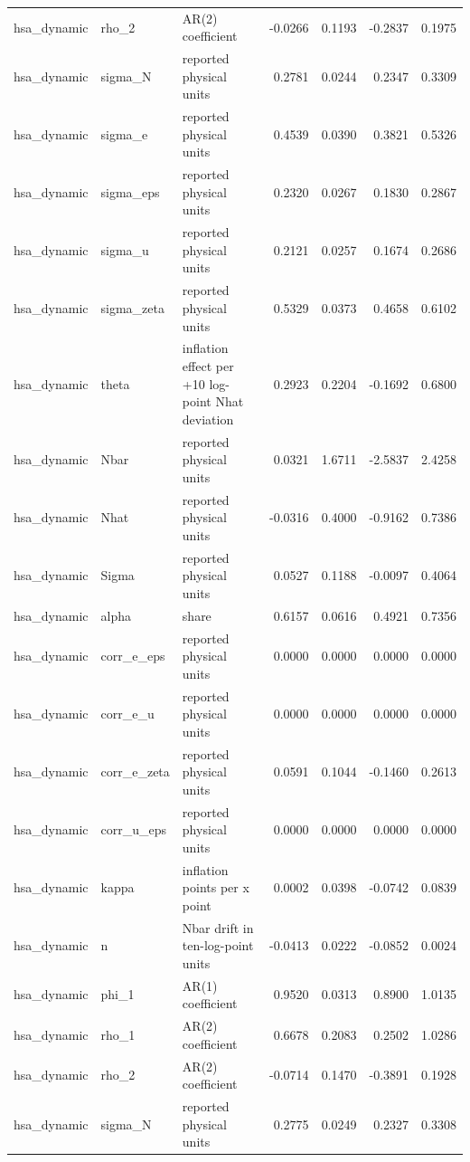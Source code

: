 \begin{tabular}{lllrrrr}
hsa\_dynamic & rho\_2 & AR(2) coefficient & -0.0266 & 0.1193 & -0.2837 & 0.1975 \\
hsa\_dynamic & sigma\_N & reported physical units & 0.2781 & 0.0244 & 0.2347 & 0.3309 \\
hsa\_dynamic & sigma\_e & reported physical units & 0.4539 & 0.0390 & 0.3821 & 0.5326 \\
hsa\_dynamic & sigma\_eps & reported physical units & 0.2320 & 0.0267 & 0.1830 & 0.2867 \\
hsa\_dynamic & sigma\_u & reported physical units & 0.2121 & 0.0257 & 0.1674 & 0.2686 \\
hsa\_dynamic & sigma\_zeta & reported physical units & 0.5329 & 0.0373 & 0.4658 & 0.6102 \\
hsa\_dynamic & theta & inflation effect per +10 log-point Nhat deviation & 0.2923 & 0.2204 & -0.1692 & 0.6800 \\
hsa\_dynamic & Nbar & reported physical units & 0.0321 & 1.6711 & -2.5837 & 2.4258 \\
hsa\_dynamic & Nhat & reported physical units & -0.0316 & 0.4000 & -0.9162 & 0.7386 \\
hsa\_dynamic & Sigma & reported physical units & 0.0527 & 0.1188 & -0.0097 & 0.4064 \\
hsa\_dynamic & alpha & share & 0.6157 & 0.0616 & 0.4921 & 0.7356 \\
hsa\_dynamic & corr\_e\_eps & reported physical units & 0.0000 & 0.0000 & 0.0000 & 0.0000 \\
hsa\_dynamic & corr\_e\_u & reported physical units & 0.0000 & 0.0000 & 0.0000 & 0.0000 \\
hsa\_dynamic & corr\_e\_zeta & reported physical units & 0.0591 & 0.1044 & -0.1460 & 0.2613 \\
hsa\_dynamic & corr\_u\_eps & reported physical units & 0.0000 & 0.0000 & 0.0000 & 0.0000 \\
hsa\_dynamic & kappa & inflation points per x point & 0.0002 & 0.0398 & -0.0742 & 0.0839 \\
hsa\_dynamic & n & Nbar drift in ten-log-point units & -0.0413 & 0.0222 & -0.0852 & 0.0024 \\
hsa\_dynamic & phi\_1 & AR(1) coefficient & 0.9520 & 0.0313 & 0.8900 & 1.0135 \\
hsa\_dynamic & rho\_1 & AR(2) coefficient & 0.6678 & 0.2083 & 0.2502 & 1.0286 \\
hsa\_dynamic & rho\_2 & AR(2) coefficient & -0.0714 & 0.1470 & -0.3891 & 0.1928 \\
hsa\_dynamic & sigma\_N & reported physical units & 0.2775 & 0.0249 & 0.2327 & 0.3308 \\

\end{tabular}
